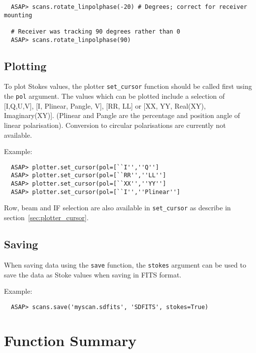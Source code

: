 \documentclass[11pt]{article}
\newcommand{\cmd}[1]{{\tt #1}}
\begin{document}
\begin{verbatim}
  ASAP> scans.rotate_linpolphase(-20) # Degrees; correct for receiver mounting

  # Receiver was tracking 90 degrees rather than 0
  ASAP> scans.rotate_linpolphase(90)  
\end{verbatim}

\subsection{Plotting}
\label{sec:polplot}

To plot Stokes values, the plotter \cmd{set\_cursor} function should
be called first using the \cmd{pol} argument. The values which can be
plotted include a selection of [I,Q,U,V], [I, Plinear, Pangle, V],
[RR, LL] or [XX, YY, Real(XY), Imaginary(XY)]. (Plinear and Pangle are
the percentage and position angle of linear polarisation). Conversion
to circular polarisations are currently not available.

Example:

\begin{verbatim}
  ASAP> plotter.set_cursor(pol=[``I'',''Q'']
  ASAP> plotter.set_cursor(pol=[``RR'',''LL'']
  ASAP> plotter.set_cursor(pol=[``XX'',''YY'']
  ASAP> plotter.set_cursor(pol=[``I'',''Plinear'']
\end{verbatim}

Row, beam and IF selection are also available in \cmd{set\_cursor} as
describe in section~\ref{sec:plotter_cursor}.

\subsection{Saving}

When saving data using the \cmd{save} function, the \cmd{stokes}
argument can be used to save the data as Stoke values when saving in
FITS format.

Example:

\begin{verbatim}
  ASAP> scans.save('myscan.sdfits', 'SDFITS', stokes=True)
\end{verbatim}

\section{Function Summary}
\end{document}
